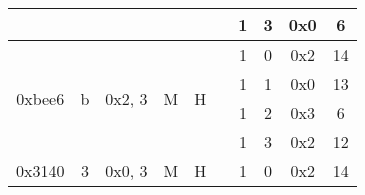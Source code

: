 \documentclass[11pt]{homework}
\newcommand{\xmark}{\ding{55}}%
\begin{document}
\begin{arabicparts}
{\begin{tabular}{|c|c|c|c|c|c|c|c|c|c|}
            \cline{7-10}
                                     &                                                                        &                             &                                                                   &                                                                    &                                                                      & 1                        & 3     & 0x0 & 6             \\
            \hline
            \multirow{4}{*}{0xbee6}  & \multirow{4}{*}{b}                                                     & \multirow{4}{*}{0x2, 3}     & \multirow{4}{*}{M}                                                & \multirow{4}{*}{H}                                                 & \multirow{4}{*}{\xmark}                                              & 1                        & 0     & 0x2 & 14            \\
            \cline{7-10}
                                     &                                                                        &                             &                                                                   &                                                                    &                                                                      & 1                        & 1     & 0x0 & 13            \\
            \cline{7-10}
                                     &                                                                        &                             &                                                                   &                                                                    &                                                                      & 1                        & 2     & 0x3 & 6             \\
            \cline{7-10}
                                     &                                                                        &                             &                                                                   &                                                                    &                                                                      & 1                        & 3     & 0x2 & 12            \\
            \hline
            \multirow{4}{*}{0x3140}  & \multirow{4}{*}{3}                                                     & \multirow{4}{*}{0x0, 3}     & \multirow{4}{*}{M}                                                & \multirow{4}{*}{H}                                                 & \multirow{4}{*}{\xmark}                                              & 1                        & 0     & 0x2 & 14            \\

\end{tabular}}
\end{arabicparts}
\end{document}

